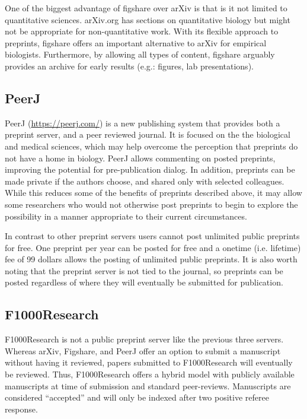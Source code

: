 \documentclass[letterpaper,twocolumn,superscriptaddress,showkeys]{revtex4}
\begin{document}
One of the biggest advantage of figshare over arXiv is that is it not
limited to quantitative sciences. arXiv.org has sections on
quantitative biology but might not be appropriate for non-quantitative
work. With its flexible approach to preprints, figshare offers an
important alternative to arXiv for empirical biologists. Furthermore,
by allowing all types of content, figshare arguably provides an
archive for early results (e.g.: figures, lab presentations).

\subsection{PeerJ}

PeerJ (\href{https://peerj.com/}{https://peerj.com/}) is a new
publishing system that provides both a preprint server, and a peer
reviewed journal.  It is focused on the the biological and medical
sciences, which may help overcome the perception that preprints do not
have a home in biology.  PeerJ allows commenting on posted preprints,
improving the potential for pre-publication dialog. In addition,
preprints can be made private if the authors choose, and shared only
with selected colleagues. While this reduces some of the benefits of
preprints described above, it may allow some researchers who would not
otherwise post preprints to begin to explore the possibility in a
manner appropriate to their current circumstances.

In contrast to other preprint servers users cannot post unlimited
public preprints for free. One preprint per year can be posted for
free and a onetime (i.e. lifetime) fee of 99 dollars allows the
posting of unlimited public preprints. It is also worth noting that
the preprint server is not tied to the journal, so preprints can be
posted regardless of where they will eventually be submitted for
publication.

\subsection{F1000Research}

F1000Research is not a public preprint server like the previous three
servers.  Whereas arXiv, Figshare, and PeerJ offer an option to submit
a manuscript without having it reviewed, papers submitted to
F1000Research will eventually be reviewed. Thus, F1000Research offers
a hybrid model with publicly available manuscripts at time of
submission and standard peer-reviews. Manuscripts are considered
``accepted'' and will only be indexed after two positive referee
response.
\end{document}
